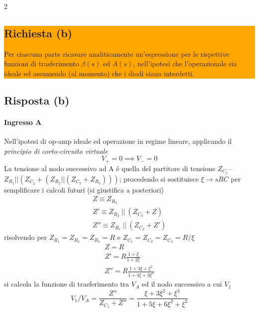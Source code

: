 \begin{multicols}{2}
  \noindent\colorbox{orange}{
    \begin{minipage}{0.9\linewidth}
      \subsection*{Richiesta (b)}
      Per ciascuna parte ricavare analiticamente un'espressione per le rispettive funzioni di
      trasferimento $\beta(s)$ ed $A(s)$, nell'ipotesi che l'operazionale sia ideale ed assumendo (al
      momento) che i diodi siano interdetti.
    \end{minipage}
  }
  \subsection*{Risposta (b)}
  \paragraph{Ingresso A}
  Nell'ipotesi di op-amp ideale ed operazione in regime lineare, applicando il \textit{principio di corto-circuito virtuale}
  \begin{equation*}
    V_+ = 0 \implies V_- = 0
  \end{equation*}
  La tensione al nodo successivo ad A \'e quella del partitore di tensione $Z_{C_1}$--$Z_{R_1}||(Z_{C_2} + (Z_{R_2}||(Z_{C_3} + Z_{R_3})))$;
  procedendo si sostituisce $\xi \to sRC$ per semplificare i calcoli futuri (si giustifica a posteriori)
  \begin{equation*}
    \begin{gathered}
      Z \equiv Z_{R_3} \\
      Z' \equiv Z_{R_2}~||~(Z_{C_3} + Z) \\
      Z'' \equiv Z_{R_1}~||~(Z_{C_2} + Z')
    \end{gathered}
  \end{equation*}
  risolvendo per $Z_{R_1} = Z_{R_2} = Z_{R_3} = R$ e $Z_{C_1} = Z_{C_2} = Z_{C_3} = R/\xi$
  \begin{equation*}
    \begin{gathered}
      Z = R \\
      Z' = R\frac{1 + \xi}{1 + 2\xi} \\
      Z'' = R\frac{1 + 3\xi + \xi^2}{1 + 4\xi + 3\xi^2}
    \end{gathered}
  \end{equation*}
  si calcola la funzione di trasferimento tra $V_A$ ed il nodo successivo a cui $V_1$
  \begin{equation*}
    V_1/V_A = \frac{Z''}{Z_{C_1} + Z''} = \frac{\xi + 3\xi^2 + \xi^3}{1 + 5\xi + 6\xi^2 + \xi^3}    

\end{equation*}
\end{multicols}
